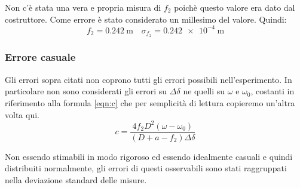\documentclass[a4paper,11pt]{article}
\begin{document}
	Non c'è stata una vera e propria misura di $ f_2 $ poichè questo valore era dato dal costruttore. Come errore è stato considerato un millesimo del valore. Quindi:
	\[ 
			f_2 = \SI{0.242}{\meter} \quad \sigma_{f_2}=\SI{0.242 e-4}{\meter}
	\]
	\subsubsection{Errore casuale}
	Gli errori sopra citati non coprono tutti gli errori possibili nell'esperimento. In particolare non sono considerati gli errori su $ \Delta\delta $ ne quelli su $ \omega $ e $ \omega_0 $, costanti in riferimento alla formula \ref{eqn:c} che per semplicità di lettura copieremo un'altra volta qui.
	\begin{equation*}
		c = \dfrac{4 f_2 D^2 \left(\omega - \omega_0 \right)}{\left(D + a - f_2\right)\Delta\delta}
	\end{equation*}
	
	Non essendo stimabili in modo rigoroso ed essendo idealmente casuali e quindi distribuiti normalmente, gli errori di questi osservabili sono stati raggruppati nella deviazione standard delle misure.
	
\end{document}
